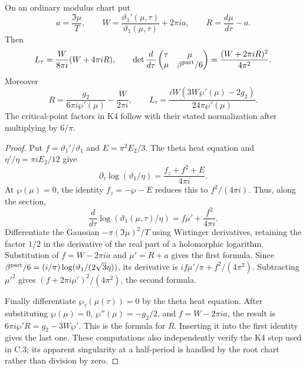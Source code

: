 \begin{statement}
On an ordinary modulus chart put
\[
 a=\frac{\Im\mu}{T},\qquad
 W=\frac{\vartheta_1'(\mu,\tau)}{\vartheta_1(\mu,\tau)}
                         +2\pi ia,\qquad
 R=\frac{d\mu}{d\tau}-a.
\]
Then
\[
 L_\tau=\frac{W}{8\pi i}(W+4\pi iR),\qquad
 \det\frac{d}{d\tau}
 \begin{pmatrix}\tau&\mu\\\mu&\beta^{\rm part}/6\end{pmatrix}
       =\frac{(W+2\pi iR)^2}{4\pi^2}.
\]
Moreover
\[
 R=\frac{g_2}{6\pi i\wp'(\mu)}-\frac{W}{2\pi i},
 \qquad
 L_\tau=\frac{iW(3W\wp'(\mu)-2g_2)}
                         {24\pi\wp'(\mu)}.
\]
The critical-point factors in K4 follow with their stated
normalization after multiplying by $6/\pi$.
\end{statement}
\begin{proof}
Put $f=\vartheta_1'/\vartheta_1$ and
$E=\pi^2E_2/3$. The theta heat equation and
$\eta'/\eta=\pi iE_2/12$ give
\[
 \partial_\tau\log(\vartheta_1/\eta)
       =\frac{f_z+f^2+E}{4\pi i}.
\]
At $\wp(\mu)=0$, the identity $f_z=-\wp-E$ reduces
this to $f^2/(4\pi i)$. Thus, along the section,
\[
 \frac{d}{d\tau}\log(\vartheta_1(\mu,\tau)/\eta)
       =f\mu'+\frac{f^2}{4\pi i}.
\]
Differentiate the Gaussian $-\pi(\Im\mu)^2/T$ using
Wirtinger derivatives, retaining the factor $1/2$ in
the derivative of the real part of a holomorphic logarithm.
Substitution of $f=W-2\pi ia$ and $\mu'=R+a$ gives the
first formula. Since
$\beta^{\rm part}/6=(i/\pi)\log(\vartheta_1/(2\sqrt3\eta))$,
its derivative is $if\mu'/\pi+f^2/(4\pi^2)$.
Subtracting $\mu'^2$ gives
$(f+2\pi i\mu')^2/(4\pi^2)$, the second formula.

Finally differentiate $\wp_\tau(\mu(\tau))=0$ by the theta
heat equation. After substituting $\wp(\mu)=0$,
$\wp''(\mu)=-g_2/2$, and $f=W-2\pi ia$, the result is
$6\pi i\wp'R=g_2-3W\wp'$. This is the formula for $R$.
Inserting it into the first identity gives the last one.
These computations also independently verify the K4 step
used in C.3; its apparent singularity at a half-period is
handled by the root chart rather than division by zero.
\end{proof}
